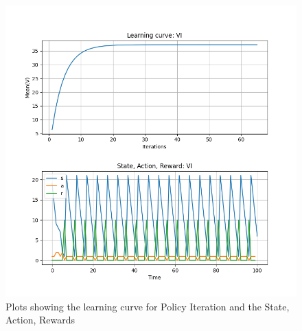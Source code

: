 \documentclass[conf]{new-aiaa}
\begin{document}
\begin{figure}[H]
\centering
\includegraphics[width=30pc]{figs/gw/learning_and_trajectory_vi.png}
\caption{Plots showing the learning curve for Policy Iteration and the State, Action, Rewards}
\label{fig_env1}
\end{figure}
\end{document}
